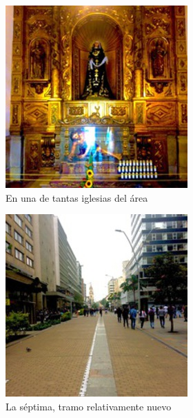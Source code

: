\documentclass[11pt]{article}
\begin{document}
\begin{figure}[htb]
\centering
\includegraphics[width=.9\linewidth]{./img/iglesia.jpg}
\caption{En una de tantas iglesias del área}
\end{figure}

\begin{figure}[htb]
\centering
\includegraphics[width=.9\linewidth]{./img/septima-peatonal.jpg}
\caption{La séptima, tramo relativamente nuevo}
\end{figure}
\end{document}
